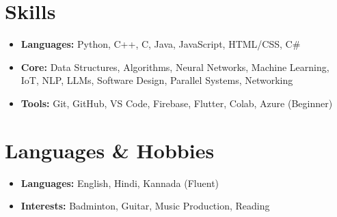 \documentclass[letterpaper,10.5pt]{article}
\newcommand{\resumeItem}[1]{\item\small{#1}}
\newcommand{\resumeItemListStart}{\begin{itemize}[noitemsep,topsep=0pt,parsep=0pt,partopsep=0pt]}
\newcommand{\resumeItemListEnd}{\end{itemize}}
\begin{document}
\section{Skills}
\resumeItemListStart
    \resumeItem{\textbf{Languages:} Python, C++, C, Java, JavaScript, HTML/CSS, C\#}
    \resumeItem{\textbf{Core:} Data Structures, Algorithms, Neural Networks, Machine Learning, IoT, NLP, LLMs, Software Design, Parallel Systems, Networking}
    \resumeItem{\textbf{Tools:} Git, GitHub, VS Code, Firebase, Flutter, Colab, Azure (Beginner)}
\resumeItemListEnd

\section{Languages \& Hobbies}
\resumeItemListStart
    \resumeItem{\textbf{Languages:} English, Hindi, Kannada (Fluent)}
    \resumeItem{\textbf{Interests:} Badminton, Guitar, Music Production, Reading}
\resumeItemListEnd
\end{document}
